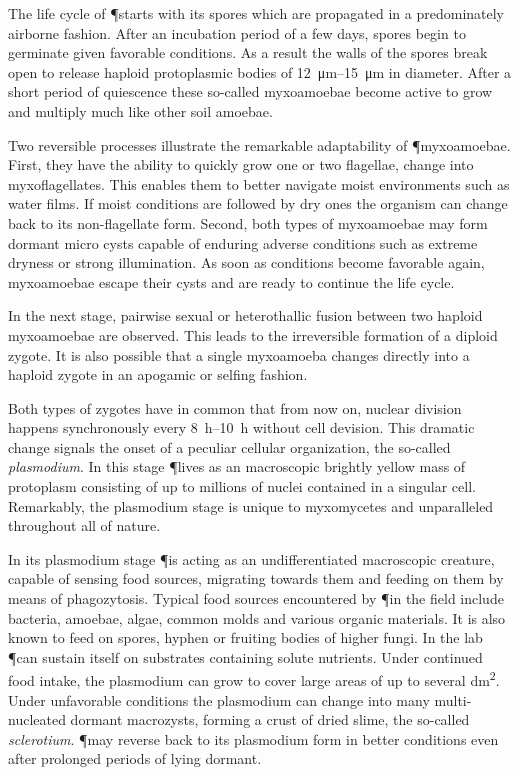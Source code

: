 		The life cycle of \P starts with its spores which are propagated in a predominately airborne fashion. After an incubation period of a few days, spores begin to germinate given favorable conditions. As a result the walls of the spores break open to release haploid protoplasmic bodies of \SIrange{12}{15}{\micro\metre} in diameter. After a short period of quiescence these so-called myxoamoebae become active to grow and multiply much like other soil amoebae. 

		Two reversible processes illustrate the remarkable adaptability of \P myxoamoebae. First, they have the ability to quickly grow one or two flagellae, \ie change into myxoflagellates. This enables them to better navigate moist environments such as water films. If moist conditions are followed by dry ones the organism can change back to its non-flagellate form. Second, both types of myxoamoebae may form dormant micro cysts capable of enduring adverse conditions such as extreme dryness or strong illumination. As soon as conditions become favorable again, myxoamoebae escape their cysts and are ready to continue the life cycle.

		In the next stage, pairwise sexual or heterothallic fusion between two haploid myxoamoebae are observed. This leads to the irreversible formation of a diploid zygote. It is also possible that a single myxoamoeba changes directly into a haploid zygote in an apogamic or selfing fashion.

		Both types of zygotes have in common that from now on, nuclear division happens synchronously every \SIrange{8}{10}{\hour} without cell devision. This dramatic change signals the onset of a peculiar cellular organization, the so-called \emph{plasmodium}. In this stage \P lives as an macroscopic brightly yellow mass of protoplasm consisting of up to millions of nuclei contained in a singular cell. Remarkably, the plasmodium stage is unique to myxomycetes and unparalleled throughout all of nature.

		In its plasmodium stage \P is acting as an undifferentiated macroscopic creature, capable of sensing food sources, migrating towards them and feeding on them by means of phagozytosis. Typical food sources encountered by \P in the field include bacteria, amoebae, algae, common molds and various organic materials. It is also known to feed on spores, hyphen or fruiting bodies of higher fungi. In the lab \P can sustain itself on substrates containing solute nutrients. Under continued food intake, the plasmodium can grow to cover large areas of up to  several \si{\deci\metre\squared}. Under unfavorable conditions the plasmodium can change into many multi-nucleated dormant macrozysts, forming a crust of dried slime, the so-called \emph{sclerotium}. \P may reverse back to its plasmodium form in better conditions even after prolonged periods of lying dormant. 

